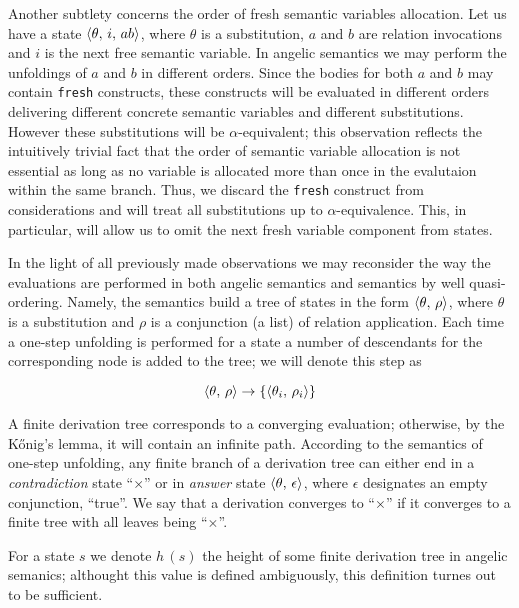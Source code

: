 Another subtlety concerns the order of fresh semantic variables allocation. Let us have a state $\langle \theta,\,i,\,ab \rangle$, where
$\theta$ is a substitution, $a$ and $b$ are relation invocations and $i$ is the next free semantic variable. In angelic semantics we
may perform the unfoldings of $a$ and $b$ in different orders. Since the bodies for both $a$ and $b$ may contain \lstinline|fresh| constructs,
these constructs will be evaluated in different orders delivering different concrete semantic variables and different substitutions. However
these substitutions will be $\alpha$-equivalent; this observation reflects the intuitively trivial fact that the order of semantic variable
allocation is not essential as long as no variable is allocated more than once in the evalutaion within the same branch. Thus, we discard
the \lstinline|fresh| construct from considerations and will treat all substitutions up to $\alpha$-equivalence. This, in particular,
will allow us to omit the next fresh variable component from states.

In the light of all previously made observations we may reconsider the way the evaluations are performed in both
angelic semantics and semantics by well quasi-ordering. Namely, the semantics build a tree of states in the form
$\langle \theta,\,\rho \rangle$, where $\theta$ is a substitution and $\rho$ is a conjunction (a list) of relation application.
Each time a one-step unfolding is performed for a state a number of descendants for the corresponding node is
added to the tree; we will denote this step as

\[
\langle \theta,\,\rho \rangle\to\{\langle \theta_i,\,\rho_i \rangle\}
\]

A finite derivation tree corresponds to a converging evaluation; otherwise, by the K\H{o}nig's lemma, it will contain an infinite path. 
According to the semantics of one-step unfolding, any finite branch of a derivation tree can either end in a \emph{contradiction} state ``$\times$''
or in \emph{answer} state $\langle \theta,\,\epsilon \rangle$, where $\epsilon$ designates an empty conjunction, ``true''. We say that a derivation
converges to ``$\times$'' if it converges to a finite tree with all leaves being ``$\times$''.

For a state $s$ we denote $h\,(s)$ the height of some finite derivation tree in angelic semanics; althought this value is defined ambiguously, this
definition turnes out to be sufficient.

